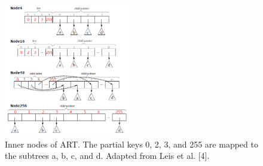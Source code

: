 \documentclass[conference]{IEEEtran}
\begin{document}
\begin{figure}
	\includegraphics[width=0.5\textwidth]{figure_4.png}
	\caption{Inner nodes of ART. The partial keys 0, 2, 3, and 255 are mapped to the subtrees a, b, c, and d. Adapted from Leis et al. [4].}
	\label{fig}
\end{figure}
\end{document}
